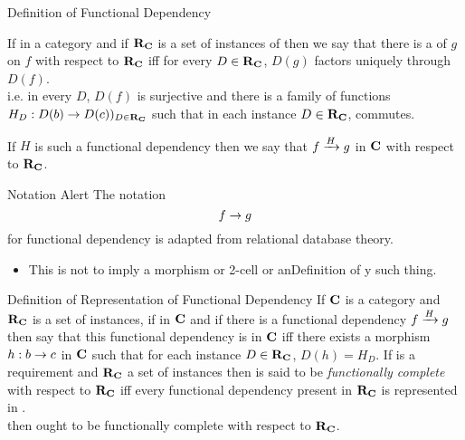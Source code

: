 \begin{frame}{Definition of Functional Dependency}
\begin{definition}
If \scalebox{0.9}{\fgsourcediagram} in a category \catcw  and if $\reqtc$ is a set of instances of \catcw
then we say that there is a   of $g$ on $f$ with respect to $\reqtc$ iff
for every $D \in \reqtc$, $D(g)$ factors uniquely through $D(f)$. \\
\pause \medskip
i.e.  in every $D$, $D(f)$ is surjective and there is a family of  functions $H_D:D(b) \morph D(c))_{D \in \reqtc}$
such that in each instance $D \in \reqtc$,
 commutes.
\end{definition}

\pause If $H$ is such a functional dependency then we say that $\fundep{H}{f}{g}$ in $\catc$ with respect to $\reqtc$.
\end{frame}

\begin{frame}{Notation Alert}
The notation 
$$
f \morph g
$$
for functional dependency is adapted from relational database theory. 

\begin{itemize}
\item This is not to imply a morphism or 2-cell or anDefinition of y such thing.
\end{itemize}
\end{frame}

\begin{frame}{Definition of Representation of Functional Dependency}
If $\catc$ is a category and $\reqtc$ is a set of instances, 
if \fgsourcediagram in $\catc$ 
and if there is a functional dependency $\fundep{H}{f}{g}$ then say that 
this functional dependency  is  in $\catc$ 
iff there exists a morphism $h:b \morph c$ in $\catc$ such that for each instance $D \in \reqtc$, $D(h)=H_D$.
\medskip
\pause If \catcw is a requirement and $\reqtc$ a set of instances then \catcw is said to be 
\textit{functionally complete} with respect to $\reqtc$ iff every functional dependency
present in $\reqtc$ is represented in \catc.\\
\medskip
\pause {}\IfSforCwithRCwords then \catcw ought to be functionally complete with respect to $\reqtc$.
\end{frame}

